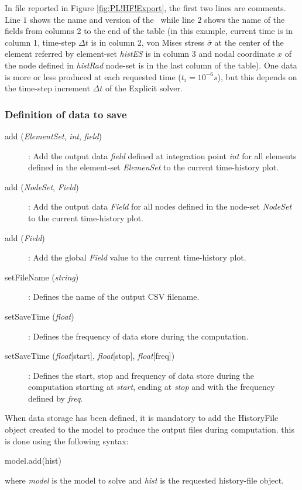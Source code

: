 In file reported in Figure \ref{fig:PL!HF!Export}, the first two lines are comments. Line $1$ shows the name and version of the \DynELA~while line $2$ shows the name of the fields from columns 2 to the end of the table (in this example, current time is in column 1, time-step $\Delta t$ is in column 2, von Mises stress $\overline{\sigma}$ at the center of the element referred by element-set \emph{histES} is in column 3 and nodal coordinate $x$ of the node defined in \emph{histRad} node-set is in the last column of the table). One data is more or less produced at each requested time ($t_i=10^{-6}s$), but this depends on the time-step increment $\Delta t$ of the Explicit solver.

\subsubsection{Definition of data to save}

\begin{description}
\item [{add (\emph{ElementSet}, \emph{int}, \emph{field})}] : Add the output data \emph{field} defined at integration point \emph{int} for all elements defined in the element-set \emph{ElemenSet} to the current time-history plot.
\item [{add (\emph{NodeSet}, \emph{Field})}] : Add the output data \emph{Field} for all nodes defined in the node-set \emph{NodeSet} to the current time-history plot.
\item [{add (\emph{Field})}] : Add the global \emph{Field} value to the current time-history plot.
\item [{setFileName (\emph{string})}] : Defines the name of the output CSV filename.
\item [{setSaveTime (\emph{float})}] : Defines the frequency of data store during the computation.
\item [{setSaveTime (\emph{float}[start], \emph{float}[stop], \emph{float}[freq])}] : Defines the start, stop and frequency of data store during the computation starting at \emph{start}, ending at \emph{stop} and with the frequency defined by \emph{freq}.
\end{description}

When data storage has been defined, it is mandatory to add the \textsf{HistoryFile} object created to the \textsf{model} to produce the output files during computation. this is done using the following syntax:
\begin{PythonListing}
model.add(hist)
\end{PythonListing}
where \emph{model} is the \textsf{model} to solve and \emph{hist} is the requested history-file object.

